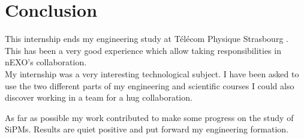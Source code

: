 \documentclass[a4paper, 11pt]{report}%
\newcommand{\TPS}{T\'el\'ecom Physique Strasbourg }
\begin{document}

\chapter{Conclusion}
  
  This internship ends my engineering study at \TPS. This has been a very good experience which allow taking 
  responsibilities in nEXO's collaboration.
  \\
  
  My internship was a very interesting technological subject. I have been asked to 
  use the two different parts of my engineering and scientific courses
  I could also discover working in a team for a hug collaboration. 
  
  As far as possible my work contributed to make some progress on the study of SiPMs. 
  Results are quiet positive and put forward my engineering formation. 
  
\end{document}
